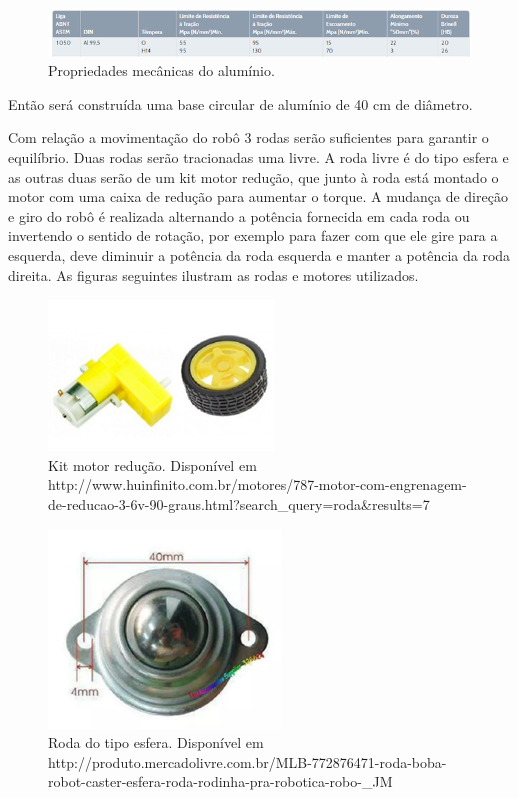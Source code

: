 			\begin{figure}[H]
				\centering
				\includegraphics[scale=0.8]{figuras/tabela_estru1.png}
				\caption{Propriedades mecânicas do alumínio.}
				\label{img:rascunho1}
			\end{figure}

			Então será construída uma base circular de alumínio de 40 cm de diâmetro.

        	Com relação a movimentação do robô 3 rodas serão suficientes para garantir o equilíbrio. Duas rodas serão tracionadas uma livre.  A roda livre é do tipo esfera e as outras duas serão de um kit motor redução, que junto à roda está montado o motor com uma caixa de redução para aumentar o torque. A mudança de direção e giro do robô é realizada alternando a potência fornecida em cada roda ou invertendo o sentido de rotação, por exemplo para fazer com que ele gire para a esquerda, deve diminuir a potência da roda esquerda e manter a potência da roda direita. As figuras seguintes ilustram as rodas e motores utilizados.

        	\begin{figure}[H]
				\centering
				\includegraphics[scale=0.7]{figuras/motor_roda.png}
				\caption{Kit motor redução. Disponível em http://www.huinfinito.com.br/motores/787-motor-com-engrenagem-de-reducao-3-6v-90-graus.html?search\_query=roda\&results=7}
				\label{img:kit_motor}
			\end{figure}

			\begin{figure}[H]
				\centering
				\includegraphics[scale=0.7]{figuras/esfera.png}
				\caption{Roda do tipo esfera. Disponível em http://produto.mercadolivre.com.br/MLB-772876471-roda-boba-robot-caster-esfera-roda-rodinha-pra-robotica-robo-\_JM}
				\label{img:esfera}
			\end{figure}

